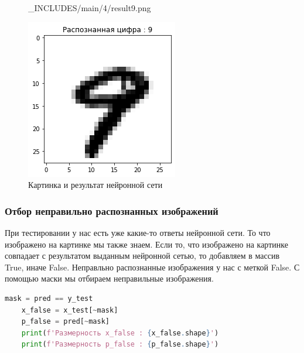 \begin{figure}[!htp]
\begin{minipage}[h]{0.19\linewidth}
        {_INCLUDES/main/4/result9.png}
    \end{minipage}
    \hfill
    \begin{minipage}[h]{0.19\linewidth}
        \centering
        \includegraphics[width=\linewidth]
        {_INCLUDES/main/4/result10.png}
    \end{minipage}

    \caption{Картинка и результат нейронной сети}
    \label{fig:4_img_and_result}
\end{figure}



\subsubsection{Отбор неправильно распознанных изображений}

При тестировании у нас есть уже какие-то ответы нейронной сети. То что изображено на картинке мы также знаем. Если то, что изображено на картинке совпадает с результатом выданным нейронной сетью, то добавляем в массив True, иначе False. Неправльно распознанные изображения у нас с меткой False. С помощью маски мы отбираем неправильные изображения.

\begin{lstlisting}[language=Python,]
    mask = pred == y_test
    x_false = x_test[~mask]
    p_false = pred[~mask]
    print(f'Размерность x_false : {x_false.shape}')
    print(f'Размерность p_false : {p_false.shape}')
\end{lstlisting}

